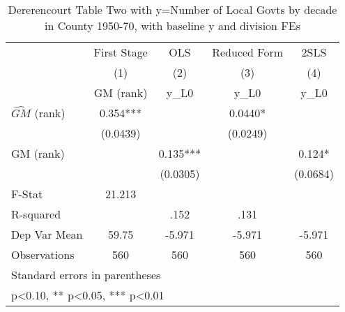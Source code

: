 \begin{table}[htbp]\centering
\def\sym#1{\ifmmode^{#1}\else\(^{#1}\)\fi}
\caption{Dererencourt Table Two with y=Number of Local Govts by decade in County 1950-70, with baseline y and division FEs}
\begin{tabular}{l*{4}{c}}
\toprule
                    & First Stage   &         OLS   &Reduced Form   &        2SLS   \\
                    &\multicolumn{1}{c}{(1)}&\multicolumn{1}{c}{(2)}&\multicolumn{1}{c}{(3)}&\multicolumn{1}{c}{(4)}\\
                    &\multicolumn{1}{c}{GM  (rank)}&\multicolumn{1}{c}{y\_L0}&\multicolumn{1}{c}{y\_L0}&\multicolumn{1}{c}{y\_L0}\\
\midrule
$\hat{GM}$ (rank)   &       0.354***&               &      0.0440*  &               \\
                    &    (0.0439)   &               &    (0.0249)   &               \\
\addlinespace
GM  (rank)          &               &       0.135***&               &       0.124*  \\
                    &               &    (0.0305)   &               &    (0.0684)   \\
\midrule
F-Stat              &      21.213   &               &               &               \\
R-squared           &               &        .152   &        .131   &               \\
Dep Var Mean        &       59.75   &      -5.971   &      -5.971   &      -5.971   \\
Observations        &         560   &         560   &         560   &         560   \\
\bottomrule
\multicolumn{5}{l}{\footnotesize Standard errors in parentheses}\\
\multicolumn{5}{l}{\footnotesize * p<0.10, ** p<0.05, *** p<0.01}\\
\end{tabular}
\end{table}
